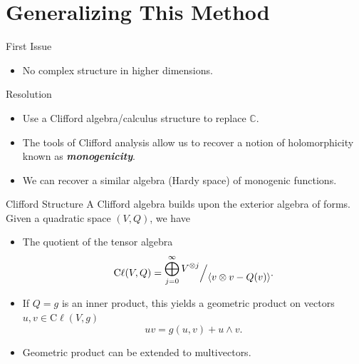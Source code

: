 \documentclass[aspectratio=169]{beamer}
\newcommand\boldgreen[1]{\textcolor{lighter_csu_green}{\emph{\textbf{#1}}}}
\newcommand{\C}{\mathbb{C}}
\newcommand{\clifford}{\mathrm{C}\ell}
\newcommand\quotient[2]{
        \mathchoice
            {%
                \text{\raise1ex\hbox{$#1$}\Big/\lower1ex\hbox{$#2$}}%
            }
            {%
                #1\,/\,#2
            }
            {%
                #1\,/\,#2
            }
            {%
                #1\,/\,#2
            }
    }
\begin{document}
\section{Generalizing This Method}

\begin{frame}{First Issue}
\vfill
\pause
    \begin{itemize}
        \item No complex structure in higher dimensions.
    \end{itemize}
    \vfill
\end{frame}

\begin{frame}{Resolution}
\vfill
\pause
    \begin{itemize}
        \item Use a Clifford algebra/calculus structure to replace $\C$.
        
        \pause
        \item The tools of Clifford analysis allow us to recover a notion of holomorphicity known as \boldgreen{monogenicity}.
        
        \pause
        \item We can recover a similar algebra (Hardy space) of monogenic functions.
    \end{itemize}
\vfill    
\end{frame}

\begin{frame}{Clifford Structure}
\vfill
    A Clifford algebra builds upon the exterior algebra of forms.  Given a quadratic space $(V,Q)$, we have
    \pause
    \begin{itemize}
        \item The quotient of the tensor algebra
        \[
        \clifford(V,Q) =\quotient{\bigoplus_{j=0}^\infty V^{\otimes j}}{\langle v \otimes v - Q(v)\rangle}.
        \]
        
        \pause
        \item If $Q=g$ is an inner product, this yields a geometric product on vectors $u,v \in \clifford(V,g)$
        \[
        uv = g(u,v) + u\wedge v.
        \]
        
        \pause
        \item Geometric product can be extended to multivectors.
    \end{itemize}   
\vfill
\end{frame}
\end{document}
